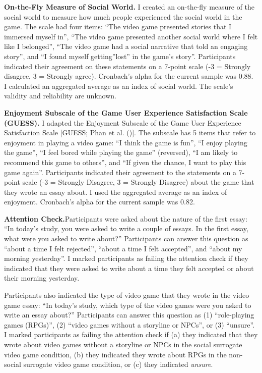 \documentclass[
]{udthesis}
\begin{document}
\textbf{On-the-Fly Measure of Social World.} I created an on-the-fly measure of the social world to measure how much people experienced the social world in the game. The scale had four items: ``The video game presented stories that I immersed myself in'', ``The video game presented another social world where I felt like I belonged'', ``The video game had a social narrative that told an engaging story'', and ``I found myself getting''lost'' in the game's story''. Participants indicated their agreement on these statements on a 7-point scale (-3 = Strongly disagree, 3 = Strongly agree). Cronbach's alpha for the current sample was 0.88. I calculated an aggregated average as an index of social world. The scale's validity and reliability are unknown.

\textbf{Enjoyment Subscale of the Game User Experience Satisfaction Scale (GUESS).} I adapted the Enjoyment Subscale of the Game User Experience Satisfaction Scale {[}GUESS; Phan et al. (){]}. The subscale has 5 items that refer to enjoyment in playing a video game: ``I think the game is fun'', ``I enjoy playing the game'', ``I feel bored while playing the game'' (reversed), ``I am likely to recommend this game to others'', and ``If given the chance, I want to play this game again''. Participants indicated their agreement to the statements on a 7-point scale (-3 = Strongly Disagree, 3 = Strongly Disagree) about the game that they wrote an essay about. I used the aggregated average as an index of enjoyment. Cronbach's alpha for the current sample was 0.82.

\textbf{Attention Check.}Participants were asked about the nature of the first essay: ``In today's study, you were asked to write a couple of essays. In the first essay, what were you asked to write about?'' Participants can answer this question as ``about a time I felt rejected'', ``about a time I felt accepted'', and ``about my morning yesterday''. I marked participants as failing the attention check if they indicated that they were asked to write about a time they felt accepted or about their morning yesterday.

Participants also indicated the type of video game that they wrote in the video game essay: ``In today's study, which type of the video games were you asked to write an essay about?'' Participants can answer this question as (1) ``role-playing games (RPGs)'', (2) ``video games without a storyline or NPCs'', or (3) ``unsure''. I marked participants as failing the attention check if (a) they indicated that they wrote about video games without a storyline or NPCs in the social surrogate video game condition, (b) they indicated they wrote about RPGs in the non-social surrogate video game condition, or (c) they indicated \emph{unsure}.
\end{document}
